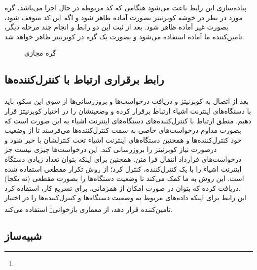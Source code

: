 {\begin{latin}
\begin{lstlisting}[caption={گره وضعیت کنترل‌کننده رابط}]
        \end{lstlisting}
    \end{latin}

    پیاده‌سازی این رابط باعث می‌شود هنگامی که کد مربوطه در حال اجرا می‌باشد، گره مورد در نظر در خوشه کوبرنیتز بصورت آماده ظاهر شود و اگه این کد متوقف شود، بصورت غیر آماده ظاهر شود.
    بعد از ثبت این دو رابط و انجام چند مرحله دیگر، تامین‌کننده ما آماده استفاده می‌شود و بصورت یک گره در کوبرنیتز ظاهر خواهد شد.
    \begin{figure}[H]
        \caption{گره مجازی}
        \label{fig:vkube_node}
    \end{figure}
}
\subsection{رابط برقراری ارتباط با کنترل‌کننده‌ها}
\label{subsec:connector}
\paragraph{}
{
    بعد از اتصال به کوبرنیتز و دریافت درخواست‌ها و بروزرسانی‌ها از سوی این سکو، باید با دستگاه‌های اینترنت اشیاء ارتباط برقرار کرده و وضعیتشان را در اختیار کوبرنیتز قرار دهیم.
    منطق ارتباط با کنترل‌کننده‌های دستگاه‌های اینترنت اشیاء به این صورت است که بصورت مداوم درخواست‌های خاصی به سمت کنترل‌کننده‌ها می‌فرستد تا از وضعیت خود کنترل‌کننده‌ها و همچنین دستگاه‌های اینترنت اشیاء تحت کنترلشان با خبر شود و درصورت نیاز کوبرنیتز را بروزرسانی کند. 
    این درخواست‌ها چیزی نیست جز درخواست‌های قرارداد انتقال فرا متن. همچنین برای اینکه بتوان تعداد زیادی دستگاه‌ اینترنت اشیاء را با یک کنترل‌کننده، کنترل کرد؛ از روش تکرار مقطعی استفاده شده است. این روش به ما کمک می‌کند تا وضعیت دستگاه‌ها را بصورت مقطعی (نه یکجا) دریافت کرده که بتوان در صورت امکان از همزمانی، برای تسریع کار، استفاده کرد.
    \\
    این رابط برای اینکه داده‌های مربوط به وضعیت دستگاه‌ها و کنترل‌کننده‌ها را در اختیار تامین‌کننده قرار دهد، از معماری بازخوانی\footnote{} استفاده می‌کند.
}

\subsection{شبیه‌ساز‍}
\label{subsec:simulator}
